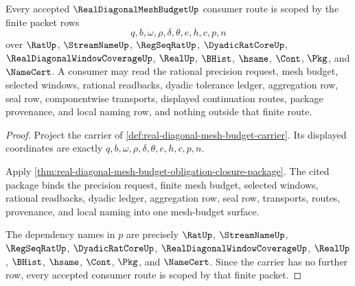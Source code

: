 \begin{theorem}
\label{thm:real-diagonal-mesh-budget-scoped-route}
Every accepted $\RealDiagonalMeshBudgetUp$ consumer route is scoped by the finite packet rows
$$
q,b,\omega,\rho,\delta,\theta,e,h,c,p,n
$$
over $\RatUp$, $\StreamNameUp$, $\RegSeqRatUp$, $\DyadicRatCoreUp$, $\RealDiagonalWindowCoverageUp$, $\RealUp$, $\BHist$, $\hsame$, $\Cont$, $\Pkg$, and $\NameCert$. A consumer may read the rational precision request, mesh budget, selected windows, rational readbacks, dyadic tolerance ledger, aggregation row, seal row, componentwise transports, displayed continuation routes, package provenance, and local naming row, and nothing outside that finite route.
\end{theorem}
\begin{proof}
Project the carrier of \autoref{def:real-diagonal-mesh-budget-carrier}. Its displayed coordinates are exactly $q,b,\omega,\rho,\delta,\theta,e,h,c,p,n$.

Apply \autoref{thm:real-diagonal-mesh-budget-obligation-closure-package}. The cited package binds the precision request, finite mesh budget, selected windows, rational readbacks, dyadic ledger, aggregation row, seal row, transports, routes, provenance, and local naming into one mesh-budget surface.

The dependency names in $p$ are precisely $\RatUp$, $\StreamNameUp$, $\RegSeqRatUp$, $\DyadicRatCoreUp$, $\RealDiagonalWindowCoverageUp$, $\RealUp$, $\BHist$, $\hsame$, $\Cont$, $\Pkg$, and $\NameCert$. Since the carrier has no further row, every accepted consumer route is scoped by that finite packet.
\end{proof}

